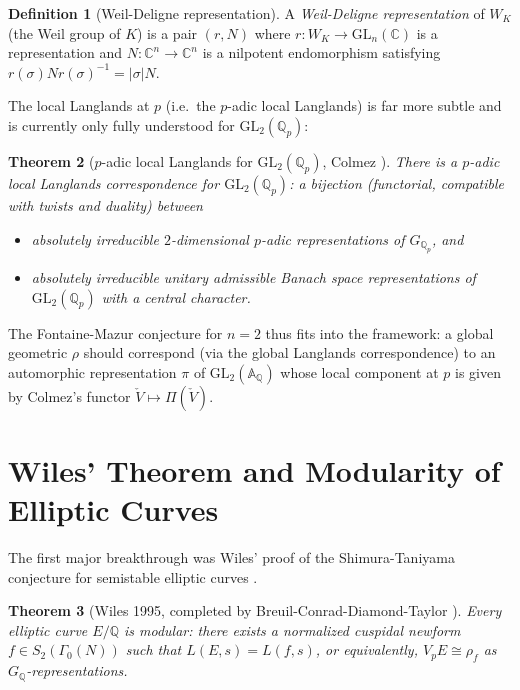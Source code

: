 \documentclass[12pt,a4paper]{amsart}
\newtheorem{theorem}{Theorem}[section]
\theoremstyle{definition}
\newtheorem{definition}[theorem]{Definition}
\theoremstyle{remark}
\newcommand{\GL}{\mathrm{GL}}
\newcommand{\Qp}{\mathbb{Q}_p}
\newcommand{\GQ}{G_{\mathbb{Q}}}
\newcommand{\Q}{\mathbb{Q}}
\newcommand{\C}{\mathbb{C}}
\begin{document}
\begin{definition}[Weil-Deligne representation]
  A \emph{Weil-Deligne representation} of $W_K$ (the Weil group of $K$) is a pair
  $(r, N)$ where $r\colon W_K \to \GL_n(\C)$ is a representation and
  $N\colon \C^n \to \C^n$ is a nilpotent endomorphism satisfying
  $r(\sigma) N r(\sigma)^{-1} = |\sigma| N$.
\end{definition}

The local Langlands at $p$ (i.e.\ the $p$-adic local Langlands) is far more subtle and
is currently only fully understood for $\GL_2(\Qp)$:

\begin{theorem}[$p$-adic local Langlands for $\GL_2(\Qp)$, Colmez \cite{Colmez2010}]
  There is a $p$-adic local Langlands correspondence for $\GL_2(\Qp)$: a bijection
  (functorial, compatible with twists and duality) between
  \begin{itemize}
    \item absolutely irreducible $2$-dimensional $p$-adic representations of $G_{\Qp}$, and
    \item absolutely irreducible unitary admissible Banach space representations of
      $\GL_2(\Qp)$ with a central character.
  \end{itemize}
\end{theorem}

The Fontaine-Mazur conjecture for $n=2$ thus fits into the framework:
a global geometric $\rho$ should correspond (via the global Langlands correspondence)
to an automorphic representation $\pi$ of $\GL_2(\mathbb{A}_\Q)$ whose local component
at $p$ is given by Colmez's functor $\check{V} \mapsto \Pi(\check{V})$.

\section{Wiles' Theorem and Modularity of Elliptic Curves}\label{sec:wiles}

The first major breakthrough was Wiles' proof of the Shimura-Taniyama conjecture for
semistable elliptic curves \cite{Wiles1995,TW1995}.

\begin{theorem}[Wiles 1995, completed by Breuil-Conrad-Diamond-Taylor \cite{BCDT2001}]
  Every elliptic curve $E/\Q$ is modular: there exists a normalized cuspidal newform
  $f \in S_2(\Gamma_0(N))$ such that
  $L(E,s) = L(f,s)$,
  or equivalently, $V_p E \cong \rho_f$ as $\GQ$-representations.
\end{theorem}
\end{document}
